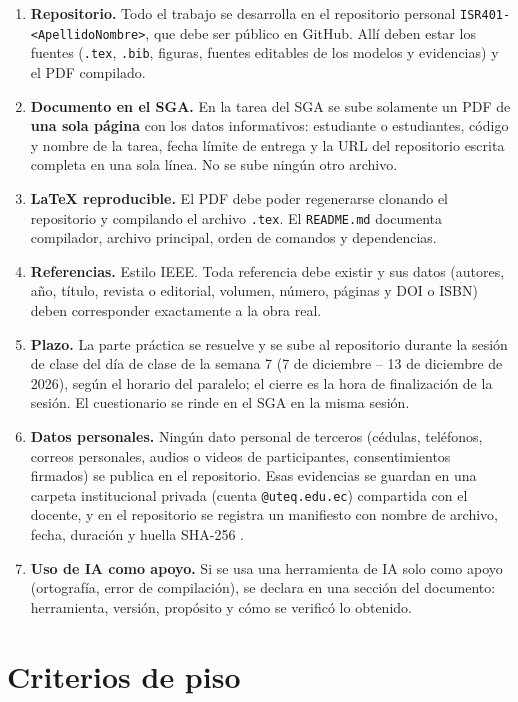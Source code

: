 \documentclass[11pt]{article}
\newcommand{\seccion}[1]{\section{\textcolor{utegreendk}{#1}}}
\begin{document}
\begin{enumerate}[leftmargin=20pt,itemsep=3pt]
	\item \textbf{Repositorio.} Todo el trabajo se desarrolla en el repositorio personal \texttt{ISR401-<ApellidoNombre>}, que debe ser público en GitHub. Allí deben estar los fuentes (\texttt{.tex}, \texttt{.bib}, figuras, fuentes editables de los modelos y evidencias) y el PDF compilado.
	\item \textbf{Documento en el SGA.} En la tarea del SGA se sube solamente un PDF de \textbf{una sola página} con los datos informativos: estudiante o estudiantes, código y nombre de la tarea, fecha límite de entrega y la URL del repositorio escrita completa en una sola línea. No se sube ningún otro archivo.
	\item \textbf{\LaTeX{} reproducible.} El PDF debe poder regenerarse clonando el repositorio y compilando el archivo \texttt{.tex}. El \texttt{README.md} documenta compilador, archivo principal, orden de comandos y dependencias.
	\item \textbf{Referencias.} Estilo IEEE. Toda referencia debe existir y sus datos (autores, año, título, revista o editorial, volumen, número, páginas y DOI o ISBN) deben corresponder exactamente a la obra real.
	\item \textbf{Plazo.} La parte práctica se resuelve y se sube al repositorio durante la sesión de clase del día de clase de la semana 7 (7 de diciembre -- 13 de diciembre de 2026), según el horario del paralelo; el cierre es la hora de finalización de la sesión. El cuestionario se rinde en el SGA en la misma sesión.
	\item \textbf{Datos personales.} Ningún dato personal de terceros (cédulas, teléfonos, correos personales, audios o videos de participantes, consentimientos firmados) se publica en el repositorio. Esas evidencias se guardan en una carpeta institucional privada (cuenta \texttt{@uteq.edu.ec}) compartida con el docente, y en el repositorio se registra un manifiesto con nombre de archivo, fecha, duración y huella SHA-256 \citep{lopdp_2021}.
	\item \textbf{Uso de IA como apoyo.} Si se usa una herramienta de IA solo como apoyo (ortografía, error de compilación), se declara en una sección del documento: herramienta, versión, propósito y cómo se verificó lo obtenido.
\end{enumerate}

\seccion{Criterios de piso}
\end{document}
